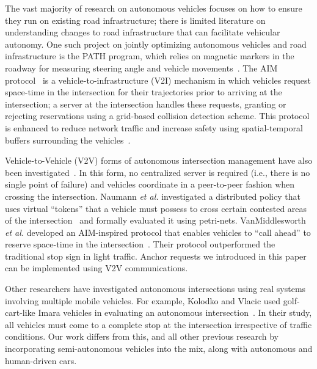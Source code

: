 The vast majority of research on autonomous vehicles focuses on how to
ensure they run on existing road infrastructure; there is limited
literature on understanding changes to road infrastructure that can
facilitate vehicular autonomy.  One such project on jointly optimizing
autonomous vehicles and road infrastructure is the PATH program, which
relies on magnetic markers in the roadway for measuring steering angle
and vehicle movements~\cite{bib:Shladover91Automated}.  The AIM
protocol~\cite{bib:Dresner08Multiagent, bib:Fajardo12Automated,
bib:Quinlan10Bringing} is a vehicle-to-infrastructure (V2I) mechanism
in which vehicles request space-time in the intersection for their
trajectories prior to arriving at the intersection; a server at the
intersection handles these requests, granting or rejecting
reservations using a grid-based collision detection scheme. This
protocol is enhanced to reduce network traffic and increase safety
using spatial-temporal buffers surrounding the
vehicles~\cite{bib:Fajardo12Automated}.

Vehicle-to-Vehicle (V2V) forms of autonomous intersection management
have also been investigated~\cite{naumann97:intersection,
ATT08-vanmiddlesworth}.  In this form, no centralized server is
required (i.e., there is no single point of failure) and vehicles
coordinate in a peer-to-peer fashion when crossing the
intersection. Naumann {\em et al.} investigated a distributed policy
that uses virtual ``tokens'' that a vehicle must possess to cross
certain contested areas of the
intersection~\cite{naumann97:intersection} and formally evaluated it
using petri-nets.  VanMiddlesworth {\em et al.} developed an
AIM-inspired protocol that enables vehicles to ``call ahead'' to
reserve space-time in the
intersection~\cite{ATT08-vanmiddlesworth}. Their protocol outperformed
the traditional stop sign in light traffic. Anchor requests we
introduced in this paper can be implemented using V2V communications.


Other researchers have investigated autonomous intersections using
real systems involving multiple mobile vehicles.  For example, Kolodko
and Vlacic used golf-cart-like Imara vehicles in evaluating an
autonomous intersection~\cite{Kolodko03:INRIA}.  In their study, all
vehicles must come to a complete stop at the intersection irrespective
of traffic conditions.  Our work differs from this, and all other
previous research by incorporating semi-autonomous vehicles into the
mix, along with autonomous and human-driven cars.



